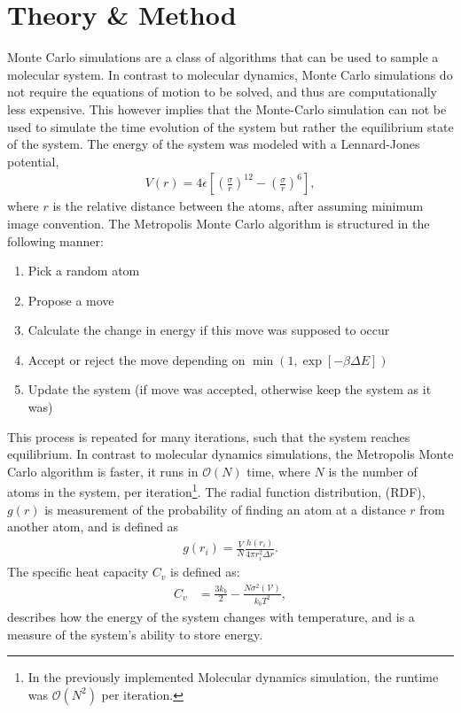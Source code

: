 \documentclass[a4paper]{article}
\begin{document}
\section*{Theory \& Method}
Monte Carlo simulations are a class of algorithms that can be used to sample a molecular system.
In contrast to molecular dynamics, Monte Carlo simulations do not require the equations of motion to be solved, and thus are computationally less expensive.
This however implies that the Monte-Carlo simulation can not be used to simulate the time evolution of the system but rather the equilibrium state of the system.
The energy of the system was modeled with a Lennard-Jones potential,
\begin{align}
    V(r) = 4\epsilon\left[\left(\frac{\sigma}{r}\right)^{12} - \left(\frac{\sigma}{r}\right)^6\right],\label{eq: LJ}
\end{align}where $r$ is the relative distance between the atoms, after assuming minimum image convention.
The Metropolis Monte Carlo algorithm is structured in the following manner:
\begin{enumerate}
    \item Pick a random atom
    \item Propose a move
    \item Calculate the change in energy if this move was supposed to occur
    \item Accept or reject the move depending on $\min\left(1, \exp\left[-\beta\Delta E\right]\right)$
    \item Update the system (if move was accepted, otherwise keep the system as it was)
\end{enumerate}This process is repeated for many iterations, such that the system reaches equilibrium.
In contrast to molecular dynamics simulations, the Metropolis Monte Carlo algorithm is faster, it runs in $\mathcal{O}(N)$ time, where $N$ is the number of atoms in the system, per iteration\footnote{In the previously implemented Molecular dynamics simulation, the runtime was $\mathcal{O}(N^2)$ per iteration.}.
The radial function distribution, (RDF), $g(r)$ is measurement of the probability of finding an atom at a distance $r$ from another atom, and is defined as
\begin{align}
    g(r_i) = \frac{V}{N}\frac{h(r_i)}{4\pi r_i^2\Delta r}.\label{eq: rdf}
\end{align}The specific heat capacity $C_v$ is defined as:
\begin{align}
    C_v &= \frac{3k_b}{2} - \frac{N\sigma^2(\mathcal{V})}{k_bT^2},\label{eq: specific heat}
\end{align}describes how the energy of the system changes with temperature, and is a measure of the system's ability to store energy.
\end{document}
